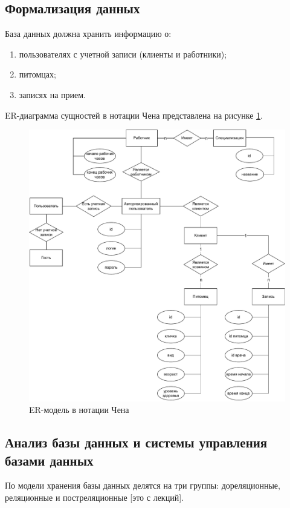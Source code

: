 \subsection{Формализация данных}

База данных должна хранить информацию о:
\begin{enumerate}[label*=---]
	\item пользователях с учетной записи (клиенты и работники);
	\item питомцах;
	\item записях на прием.
\end{enumerate}

ER-диаграмма сущностей в нотации Чена представлена на рисунке \ref{img:er}.

\begin{figure}[!h]
	\centering
	\includegraphics[width=170mm]{image/er}
	\caption{ER-модель в нотации Чена}
	\label{img:er}
\end{figure}


\subsection{Анализ базы данных и системы управления базами данных}

По модели хранения базы данных делятся на три группы: дореляционные, реляционные и постреляционные [это с лекций]. 

